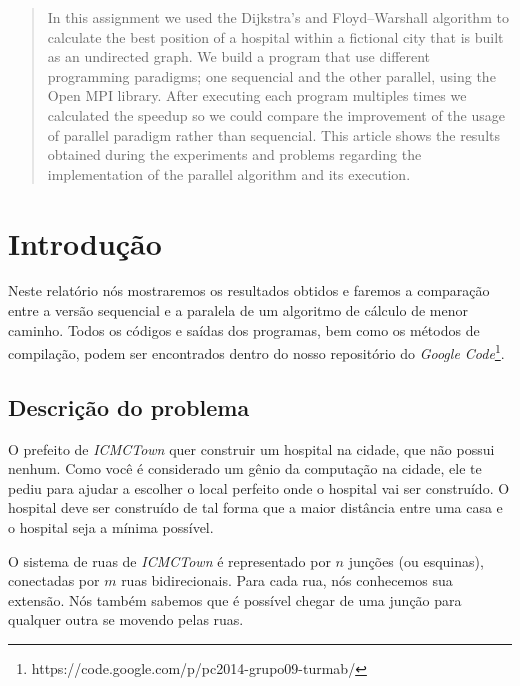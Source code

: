 \documentclass[11pt,twoside]{article}
\begin{document}

\tableofcontents
\listoffigures
\listoftables
\lstlistoflistings
\listofalgorithms

\clearpage

\begin{abstract} 
    In this assignment we used the Dijkstra's and Floyd–Warshall algorithm to
    calculate the best position of a hospital within a fictional city that is
    built as an undirected graph. We build a program that use different programming
    paradigms; one sequencial and the other parallel, using the Open MPI library.
    After executing each program multiples times we calculated the speedup so we 
    could compare the improvement of the usage of parallel paradigm rather than
    sequencial. This article shows the results obtained during the experiments 
    and problems regarding the implementation of the parallel algorithm and its
    execution.
\end{abstract}


\section{Introdução}

    Neste relatório nós mostraremos os resultados obtidos e faremos a comparação entre a
    versão sequencial e a paralela de um algoritmo de cálculo de menor caminho. Todos os
    códigos e saídas dos programas, bem como os métodos de compilação, podem ser 
    encontrados dentro do nosso repositório do 
    {\it Google Code}\footnote{https://code.google.com/p/pc2014-grupo09-turmab/\label{fnt:code}}.

    \subsection{Descrição do problema}
    
        O prefeito de {\it ICMCTown} quer construir um hospital na cidade, que não possui nenhum.
        Como você é considerado um gênio da computação na cidade, ele te pediu para ajudar a escolher
        o local perfeito onde o hospital vai ser construído. O hospital deve ser construído de tal
        forma que a maior distância entre uma casa e o hospital seja a mínima possível.

        O sistema de ruas de {\it ICMCTown} é representado por $n$ junções (ou esquinas), conectadas
        por $m$ ruas bidirecionais. Para cada rua, nós conhecemos sua extensão. Nós também sabemos
        que é possível chegar de uma junção para qualquer outra se movendo pelas ruas.
\end{document}
